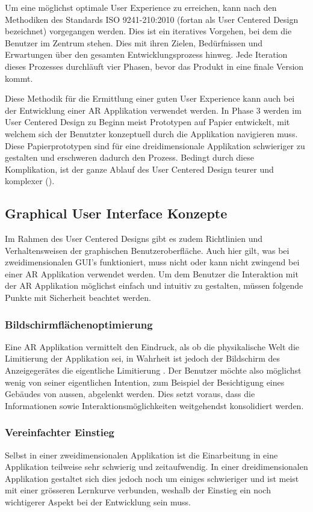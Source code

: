 \documentclass[a4paper]{scrreprt}
\begin{document}
Um eine möglichst optimale User Experience zu erreichen, kann nach den Methodiken des Standards ISO 9241-210:2010 (fortan als User Centered Design bezeichnet) vorgegangen werden. Dies ist ein iteratives Vorgehen, bei dem die Benutzer im Zentrum stehen. Dies mit ihren Zielen, Bedürfnissen und Erwartungen über den gesamten Entwicklungsprozess hinweg.
Jede Iteration dieses Prozesses durchläuft vier Phasen, bevor das Produkt in eine finale Version kommt.

Diese Methodik für die Ermittlung einer guten User Experience kann auch bei der Entwicklung einer AR Applikation verwendet werden.
In Phase 3 werden im User Centered Design zu Beginn meist Prototypen auf Papier entwickelt, mit welchem sich der Benutzter konzeptuell durch die Applikation navigieren muss. Diese Papierprototypen sind für eine dreidimensionale Applikation schwieriger zu gestalten und erschweren dadurch den Prozess. Bedingt durch diese Komplikation, ist der ganze Ablauf des User Centered Design teurer und komplexer (\cite{ISO9241}).

\subsection{Graphical User Interface Konzepte}
Im Rahmen des User Centered Designs gibt es zudem Richtlinien und Verhaltensweisen der graphischen Benutzeroberfläche.
Auch hier gilt, was bei zweidimensionalen GUI's funktioniert, muss nicht oder kann nicht zwingend bei einer AR Applikation verwendet werden. Um dem Benutzer die Interaktion mit der AR Applikation möglichst einfach und intuitiv zu gestalten, müssen folgende Punkte mit Sicherheit beachtet werden.

\subsubsection{Bildschirmflächenoptimierung}
Eine AR Applikation vermittelt den Eindruck, als ob die physikalische Welt die Limitierung der Applikation sei, in Wahrheit ist jedoch der Bildschirm des Anzeigegerätes die eigentliche Limitierung .
Der Benutzer möchte also möglichst wenig von seiner eigentlichen Intention, zum Beispiel der Besichtigung eines Gebäudes von aussen, abgelenkt werden. Dies setzt voraus, dass die Informationen sowie Interaktionsmöglichkeiten weitgehendst konsolidiert werden.

\subsubsection{Vereinfachter Einstieg}
Selbst in einer zweidimensionalen Applikation ist die Einarbeitung in eine Applikation teilweise sehr schwierig und zeitaufwendig. In einer dreidimensionalen Applikation gestaltet sich dies jedoch noch um einiges schwieriger und ist meist mit einer grösseren Lernkurve verbunden, weshalb der Einstieg ein noch wichtigerer Aspekt bei der Entwicklung sein muss.
\end{document}
